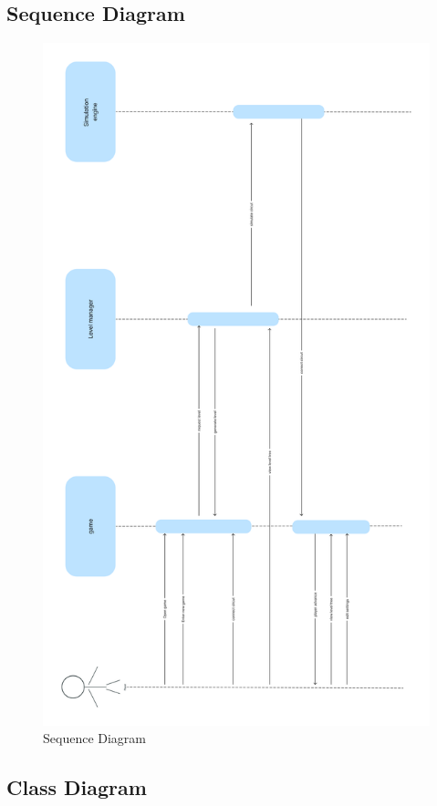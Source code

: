 \documentclass[../main.tex]{subfiles}
\begin{document}
\subsection{Sequence Diagram}
\begin{figure}[h!t]
\centering
\includegraphics[scale=0.11]{images/chapter3/sq.png}
\caption{Sequence Diagram}
\label{Sequence Diagram}
\end{figure}
\vfill
\newpage
\subsection{Class Diagram}
\end{document}

